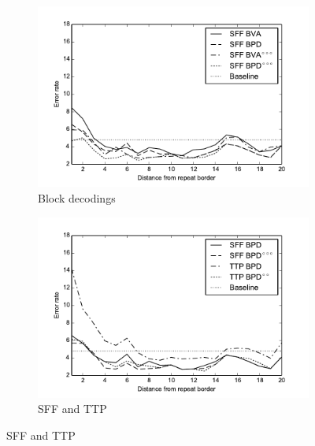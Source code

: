 \begin{figure}
\begin{center}
\begin{subfigure}{0.5\textwidth}
\includegraphics[width=\textwidth]{../figures/error_graph_sffblock.pdf}
\caption{Block decodings}\label{FIGURE:SFFBLOCKS}
\end{subfigure}%
\begin{subfigure}{0.5\textwidth}
\includegraphics[width=\textwidth]{../figures/error_graph_sffvstantan.pdf}
\caption{SFF and TTP}\label{FIGURE:SFFTANTAN}
\end{subfigure}%

\end{center}
\end{figure}
